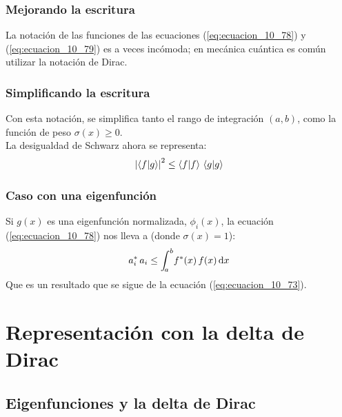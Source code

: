 \documentclass[12pt]{beamer}
\begin{document}
\begin{frame}
\frametitle{Mejorando la escritura}
La notación de las funciones de las ecuaciones (\ref{eq:ecuacion_10_78}) y (\ref{eq:ecuacion_10_79}) es a veces incómoda; \pause en mecánica cuántica es común utilizar la notación de Dirac.
\end{frame}
\begin{frame}
\frametitle{Simplificando la escritura}
Con esta notación, se simplifica tanto el rango de integración $(a, b)$, como la función de peso $\sigma (x) \geq 0$. 
\\
\bigskip
\pause
La desigualdad de Schwarz ahora se representa:
\pause
\begin{align}
\abs{\braket{f}{g}}^{2} \leq \braket{f}{f} \, \braket{g}{g}
\label{eq:ecuacion_10_78a}
\end{align}
\end{frame}
\begin{frame}
\frametitle{Caso con una eigenfunción}
Si $g (x)$ es una eigenfunción normalizada, $\phi_{i} (x)$, la ecuación (\ref{eq:ecuacion_10_78}) nos lleva a (donde $\sigma (x) = 1$):
\pause
\begin{align}
a_{i}^{*} \, a_{i} \leq \scaleint{5ex}_{\bs a}^{b} f^{*} (x) \, f (x) \dd{x} 
\label{eq:ecuacion_10_81}
\end{align}
Que es un resultado que se sigue de la ecuación (\ref{eq:ecuacion_10_73}).
\end{frame}


\section{Representación con la delta de Dirac}
\subsection{Eigenfunciones y la delta de Dirac}
\end{document}
